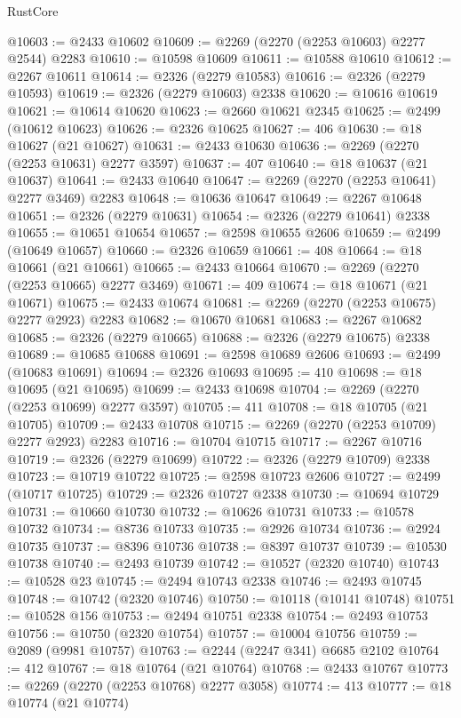 \begin{lexlean}{RustCore}
\begin{coremodule}
@10603 := @2433 @10602
@10609 := @2269 (@2270 (@2253 @10603) @2277 @2544) @2283
@10610 := @10598 @10609
@10611 := @10588 @10610
@10612 := @2267 @10611
@10614 := @2326 (@2279 @10583)
@10616 := @2326 (@2279 @10593)
@10619 := @2326 (@2279 @10603) @2338
@10620 := @10616 @10619
@10621 := @10614 @10620
@10623 := @2660 @10621 @2345
@10625 := @2499 (@10612 @10623)
@10626 := @2326 @10625
@10627 := 406
@10630 := @18 @10627 (@21 @10627)
@10631 := @2433 @10630
@10636 := @2269 (@2270 (@2253 @10631) @2277 @3597)
@10637 := 407
@10640 := @18 @10637 (@21 @10637)
@10641 := @2433 @10640
@10647 := @2269 (@2270 (@2253 @10641) @2277 @3469) @2283
@10648 := @10636 @10647
@10649 := @2267 @10648
@10651 := @2326 (@2279 @10631)
@10654 := @2326 (@2279 @10641) @2338
@10655 := @10651 @10654
@10657 := @2598 @10655 @2606
@10659 := @2499 (@10649 @10657)
@10660 := @2326 @10659
@10661 := 408
@10664 := @18 @10661 (@21 @10661)
@10665 := @2433 @10664
@10670 := @2269 (@2270 (@2253 @10665) @2277 @3469)
@10671 := 409
@10674 := @18 @10671 (@21 @10671)
@10675 := @2433 @10674
@10681 := @2269 (@2270 (@2253 @10675) @2277 @2923) @2283
@10682 := @10670 @10681
@10683 := @2267 @10682
@10685 := @2326 (@2279 @10665)
@10688 := @2326 (@2279 @10675) @2338
@10689 := @10685 @10688
@10691 := @2598 @10689 @2606
@10693 := @2499 (@10683 @10691)
@10694 := @2326 @10693
@10695 := 410
@10698 := @18 @10695 (@21 @10695)
@10699 := @2433 @10698
@10704 := @2269 (@2270 (@2253 @10699) @2277 @3597)
@10705 := 411
@10708 := @18 @10705 (@21 @10705)
@10709 := @2433 @10708
@10715 := @2269 (@2270 (@2253 @10709) @2277 @2923) @2283
@10716 := @10704 @10715
@10717 := @2267 @10716
@10719 := @2326 (@2279 @10699)
@10722 := @2326 (@2279 @10709) @2338
@10723 := @10719 @10722
@10725 := @2598 @10723 @2606
@10727 := @2499 (@10717 @10725)
@10729 := @2326 @10727 @2338
@10730 := @10694 @10729
@10731 := @10660 @10730
@10732 := @10626 @10731
@10733 := @10578 @10732
@10734 := @8736 @10733
@10735 := @2926 @10734
@10736 := @2924 @10735
@10737 := @8396 @10736
@10738 := @8397 @10737
@10739 := @10530 @10738
@10740 := @2493 @10739
@10742 := @10527 (@2320 @10740)
@10743 := @10528 @23
@10745 := @2494 @10743 @2338
@10746 := @2493 @10745
@10748 := @10742 (@2320 @10746)
@10750 := @10118 (@10141 @10748)
@10751 := @10528 @156
@10753 := @2494 @10751 @2338
@10754 := @2493 @10753
@10756 := @10750 (@2320 @10754)
@10757 := @10004 @10756
@10759 := @2089 (@9981 @10757)
@10763 := @2244 (@2247 @341) @6685 @2102
@10764 := 412
@10767 := @18 @10764 (@21 @10764)
@10768 := @2433 @10767
@10773 := @2269 (@2270 (@2253 @10768) @2277 @3058)
@10774 := 413
@10777 := @18 @10774 (@21 @10774)

\end{coremodule}
\end{lexlean}

